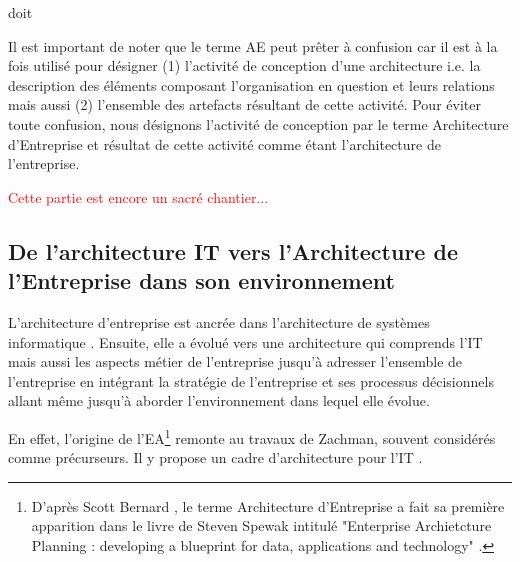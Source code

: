 %
%
doit 
%
%


Il est important de noter que le terme AE peut prêter à confusion car il est à 
la fois utilisé pour désigner (1) l'activité de conception d'une architecture 
i.e. la description des éléments composant l'organisation en question et leurs 
relations mais aussi (2) l'ensemble des artefacts résultant de cette activité. 
Pour éviter toute confusion, nous désignons l'activité de conception par le 
terme Architecture d'Entreprise et résultat de cette activité comme étant 
l'architecture de l'entreprise.

\textcolor{red}{Cette partie est encore un sacré chantier...}


\subsection{De l'architecture IT vers l'Architecture de l'Entreprise dans son 
environnement}

L'architecture d'entreprise est ancrée dans l'architecture de systèmes 
informatique \cite{kappelman2008enterprise}. Ensuite, elle a évolué vers une 
architecture qui comprends l'IT mais aussi les aspects métier de l'entreprise 
\cite{winter2006essential}  jusqu'à adresser l'ensemble de l'entreprise en 
intégrant la stratégie de l'entreprise et ses processus décisionnels 
\cite{ross2006enterprise} allant même jusqu'à aborder l'environnement dans 
lequel elle évolue.

En effet, l'origine de l'EA\footnote{D'après Scott Bernard 
\cite{bernard2012introduction}, le terme Architecture d'Entreprise a fait sa 
première apparition dans le livre de Steven Spewak intitulé "Enterprise 
Archietcture Planning : developing a blueprint for data, applications and 
technology" \cite{spewak1993enterprise}.} remonte au travaux de Zachman, souvent 
considérés comme précurseurs. Il y propose un cadre d'architecture pour l'IT 
\cite{zachman1987framework}.

